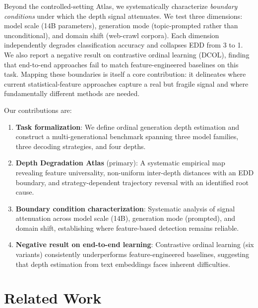 \documentclass[11pt,a4paper]{article}
\begin{document}
Beyond the controlled-setting Atlas, we systematically characterize \emph{boundary conditions} under which the depth signal attenuates.
We test three dimensions: model scale (14B parameters), generation mode (topic-prompted rather than unconditional), and domain shift (web-crawl corpora).
Each dimension independently degrades classification accuracy and collapses EDD from 3 to 1.
We also report a negative result on contrastive ordinal learning (DCOL), finding that end-to-end approaches fail to match feature-engineered baselines on this task.
Mapping these boundaries is itself a core contribution: it delineates where current statistical-feature approaches capture a real but fragile signal and where fundamentally different methods are needed.

Our contributions are:
\begin{enumerate}
\item \textbf{Task formalization}: We define ordinal generation depth estimation and construct a multi-generational benchmark spanning three model families, three decoding strategies, and four depths.
\item \textbf{Depth Degradation Atlas} (primary): A systematic empirical map revealing feature universality, non-uniform inter-depth distances with an EDD boundary, and strategy-dependent trajectory reversal with an identified root cause.
\item \textbf{Boundary condition characterization}: Systematic analysis of signal attenuation across model scale (14B), generation mode (prompted), and domain shift, establishing where feature-based detection remains reliable.
\item \textbf{Negative result on end-to-end learning}: Contrastive ordinal learning (six variants) consistently underperforms feature-engineered baselines, suggesting that depth estimation from text embeddings faces inherent difficulties.
\end{enumerate}

\section{Related Work}
\label{sec:related}
\end{document}
